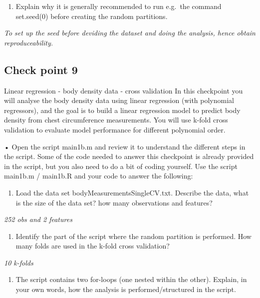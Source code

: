 \documentclass[
  letterpaper,
  DIV=11,
  numbers=noendperiod]{scrartcl}
\providecommand{\tightlist}{%
  \setlength{\itemsep}{0pt}\setlength{\parskip}{0pt}}\usepackage{longtable,booktabs,array}
\begin{document}
\begin{enumerate}
\def\labelenumi{(\alph{enumi})}
\setcounter{enumi}{2}
\tightlist
\item
  Explain why it is generally recommended to run e.g.~the command
  set.seed(0) before creating the random partitions.
\end{enumerate}

\emph{To set up the seed before deviding the dataset and doing the
analysis, hence obtain reproduceability.}

\hypertarget{check-point-9}{%
\subsection{Check point 9}\label{check-point-9}}

Linear regression - body density data - cross validation In this
checkpoint you will analyse the body density data using linear
regression (with polynomial regressors), and the goal is to build a
linear regression model to predict body density from chest circumference
measurements. You will use k-fold cross validation to evaluate model
performance for different polynomial order.

• Open the script main1b.m and review it to understand the different
steps in the script. Some of the code needed to answer this checkpoint
is already provided in the script, but you also need to do a bit of
coding yourself. Use the script main1b.m / main1b.R and your code to
answer the following:

\begin{enumerate}
\def\labelenumi{(\alph{enumi})}
\tightlist
\item
  Load the data set bodyMeasurementsSingleCV.txt. Describe the data,
  what is the size of the data set? how many observations and features?
\end{enumerate}

\emph{252 obs and 2 features}

\begin{enumerate}
\def\labelenumi{(\alph{enumi})}
\setcounter{enumi}{1}
\tightlist
\item
  Identify the part of the script where the random partition is
  performed. How many folds are used in the k-fold cross validation?
\end{enumerate}

\emph{10 k-folds}

\begin{enumerate}
\def\labelenumi{(\alph{enumi})}
\setcounter{enumi}{2}
\tightlist
\item
  The script contains two for-loops (one nested within the other).
  Explain, in your own words, how the analysis is performed/structured
  in the script.
\end{enumerate}
\end{document}
